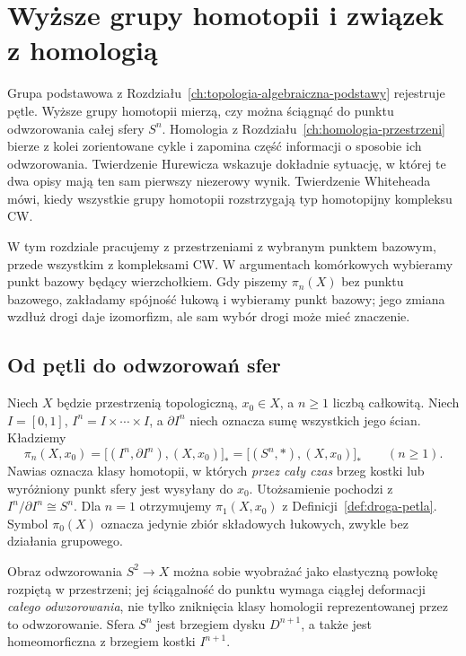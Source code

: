 \chapter{Wyższe grupy homotopii i związek z homologią}
\label{ch:wyzsza-homotopia}

\providecommand{\atlasref}[2]{#2}

Grupa podstawowa z Rozdziału~\ref{ch:topologia-algebraiczna-podstawy}
rejestruje pętle. Wyższe grupy homotopii mierzą, czy można
ściągnąć do punktu odwzorowania całej sfery $S^n$. Homologia z
Rozdziału~\ref{ch:homologia-przestrzeni} bierze z kolei
zorientowane cykle i zapomina część informacji o sposobie ich
odwzorowania. Twierdzenie Hurewicza wskazuje dokładnie sytuację,
w której te dwa opisy mają ten sam pierwszy niezerowy wynik.
Twierdzenie Whiteheada mówi, kiedy wszystkie grupy homotopii
rozstrzygają typ homotopijny kompleksu CW.

W tym rozdziale pracujemy z przestrzeniami z wybranym punktem bazowym,
przede wszystkim z kompleksami CW. W argumentach komórkowych
wybieramy punkt bazowy będący wierzchołkiem. Gdy piszemy
$\pi_n(X)$ bez punktu bazowego, zakładamy spójność łukową i
wybieramy punkt bazowy; jego zmiana wzdłuż drogi daje izomorfizm, ale
sam wybór drogi może mieć znaczenie.

\section{Od pętli do odwzorowań sfer}
\label{sec:grupy-pi-n}

\begin{definicja}
\label{def:pi-n}
Niech $X$ będzie przestrzenią topologiczną, $x_0\in X$,
a $n\geq1$ liczbą całkowitą.
Niech $I=[0,1]$, $I^n=I\times\cdots\times I$,
a $\partial I^n$ niech oznacza sumę wszystkich jego ścian.
Kładziemy
\[
 \pi_n(X,x_0)
 =\big[(I^n,\partial I^n),(X,x_0)\big]_*
 =\big[(S^n,*),(X,x_0)\big]_*
 \qquad(n\geq1).
\]
Nawias oznacza klasy homotopii, w których
\emph{przez cały czas} brzeg kostki lub wyróżniony
punkt sfery jest wysyłany do $x_0$.
Utożsamienie pochodzi z $I^n/\partial I^n\cong S^n$.
Dla $n=1$ otrzymujemy $\pi_1(X,x_0)$ z
Definicji~\ref{def:droga-petla}. Symbol $\pi_0(X)$
oznacza jedynie zbiór składowych łukowych,
zwykle bez działania grupowego.
\end{definicja}

Obraz odwzorowania $S^2\to X$ można sobie wyobrażać jako
elastyczną powłokę rozpiętą w przestrzeni; jej
ściągalność do punktu wymaga ciągłej deformacji
\emph{całego odwzorowania}, nie tylko zniknięcia klasy
homologii reprezentowanej przez to odwzorowanie. Sfera $S^n$ jest brzegiem dysku $D^{n+1}$,
a także jest homeomorficzna z brzegiem kostki $I^{n+1}$.


